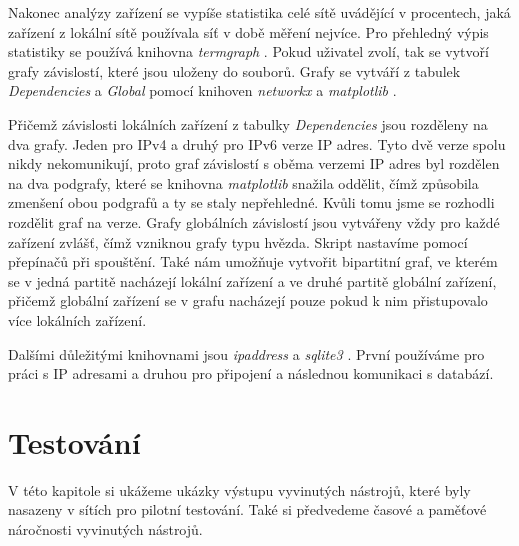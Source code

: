 \documentclass[thesis=B,czech,hidelinks]{FITthesis}[2019/03/21]
\begin{document}
    Nakonec analýzy zařízení se vypíše statistika celé sítě uvádějící v procentech, jaká zařízení z lokální sítě používala síť v době měření nejvíce. Pro přehledný výpis statistiky se používá knihovna \emph{termgraph} \cite{TERMGRAPH}. Pokud uživatel zvolí, tak se vytvoří grafy závislostí, které jsou uloženy do souborů. Grafy se vytváří z tabulek \emph{Dependencies} a \emph{Global} pomocí knihoven \emph{networkx} \cite{NETWORKX} a \emph{matplotlib} \cite{MATPLOTLIB}. 
    
    Přičemž závislosti lokálních zařízení z tabulky \emph{Dependencies} jsou rozděleny na dva grafy. Jeden pro IPv4 a druhý pro IPv6 verze IP adres. Tyto dvě verze spolu nikdy nekomunikují, proto graf závislostí s oběma verzemi IP adres byl rozdělen na dva podgrafy, které se knihovna \emph{matplotlib} \cite{MATPLOTLIB} snažila oddělit, čímž způsobila zmenšení obou podgrafů a ty se staly nepřehledné. Kvůli tomu jsme se rozhodli rozdělit graf na verze. Grafy globálních závislostí jsou vytvářeny vždy pro každé zařízení zvlášť, čímž vzniknou grafy typu hvězda. Skript nastavíme pomocí přepínačů při spouštění. Také nám umožňuje vytvořit bipartitní graf, ve kterém se v jedná partitě nacházejí lokální zařízení a ve druhé partitě globální zařízení, přičemž globální zařízení se v grafu nacházejí pouze pokud k nim přistupovalo více lokálních zařízení.
    
    Dalšími důležitými knihovnami jsou \emph{ipaddress} \cite{IPADDRESS} a \emph{sqlite3} \cite{SQLITE3}. První používáme pro práci s IP adresami a druhou pro připojení a následnou komunikaci s databází.

    
\chapter{Testování}
V této kapitole si ukážeme ukázky výstupu vyvinutých nástrojů, které byly nasazeny v sítích pro pilotní testování. Také si předvedeme časové a paměťové náročnosti vyvinutých nástrojů.
\end{document}
